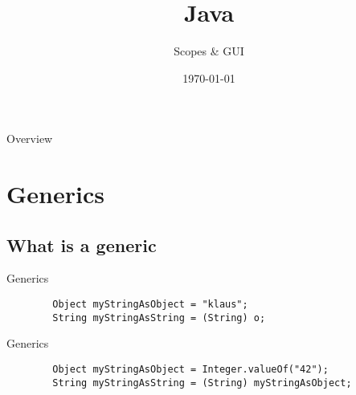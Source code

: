 


\title{Java}
\subtitle{Scopes & GUI}
\date{\today}



\begin{frame}
\titlepage
\end{frame}

\begin{frame}{Overview}
\tableofcontents
\end{frame}

\section{Generics}
\subsection{What is a generic}
\begin{frame}[fragile]{Generics}
	\begin{lstlisting}
		Object myStringAsObject = "klaus";
		String myStringAsString = (String) o;
	\end{lstlisting}
\end{frame}

\begin{frame}[fragile]{Generics}
	\begin{lstlisting}
		Object myStringAsObject = Integer.valueOf("42");
		String myStringAsString = (String) myStringAsObject;
	\end{lstlisting}
\end{frame}

